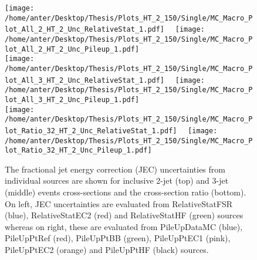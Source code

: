 \begin{figure}[!hbtp]
\hspace*{-5mm}\texttt{[image: /home/anter/Desktop/Thesis/Plots\_HT\_2\_150/Single/MC\_Macro\_Plot\_All\_2\_HT\_2\_Unc\_RelativeStat\_1.pdf]}%
~~\texttt{[image: /home/anter/Desktop/Thesis/Plots\_HT\_2\_150/Single/MC\_Macro\_Plot\_All\_2\_HT\_2\_Unc\_Pileup\_1.pdf]}\\
\hspace*{-5mm}\texttt{[image: /home/anter/Desktop/Thesis/Plots\_HT\_2\_150/Single/MC\_Macro\_Plot\_All\_3\_HT\_2\_Unc\_RelativeStat\_1.pdf]}%
~~\texttt{[image: /home/anter/Desktop/Thesis/Plots\_HT\_2\_150/Single/MC\_Macro\_Plot\_All\_3\_HT\_2\_Unc\_Pileup\_1.pdf]}\\
\hspace*{-5mm}\texttt{[image: /home/anter/Desktop/Thesis/Plots\_HT\_2\_150/Single/MC\_Macro\_Plot\_Ratio\_32\_HT\_2\_Unc\_RelativeStat\_1.pdf]}%
~~\texttt{[image: /home/anter/Desktop/Thesis/Plots\_HT\_2\_150/Single/MC\_Macro\_Plot\_Ratio\_32\_HT\_2\_Unc\_Pileup\_1.pdf]}
\caption[The fractional jet energy correction (JEC) uncertainties from individual sources (Part III).]{The fractional jet energy correction (JEC) uncertainties from individual sources are shown for inclusive 2-jet (top) and 3-jet (middle) events cross-sections and the cross-section ratio \ratio (bottom). On left, JEC uncertainties are evaluated from RelativeStatFSR (blue), RelativeStatEC2 (red) and RelativeStatHF (green) sources whereas on right, these are evaluated from PileUpDataMC (blue), PileUpPtRef (red), PileUpPtBB (green), PileUpPtEC1 (pink), PileUpPtEC2 (orange) and PileUpPtHF (black) sources.}
\label{fig:jes3}
\end{figure}
\newpage
